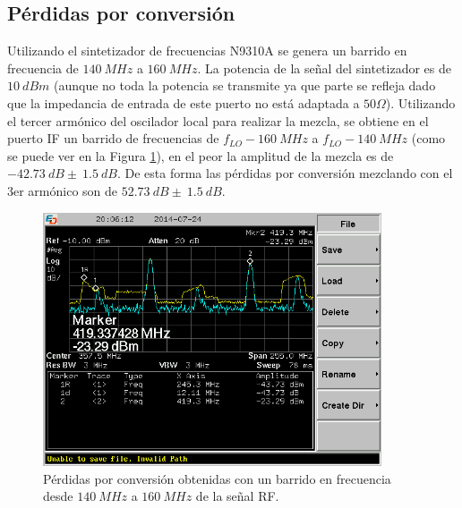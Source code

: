 \documentclass[a4paper,10pt]{article}
\begin{document}
	\subsection{P\'erdidas por conversi\'on}
	Utilizando el sintetizador de frecuencias N9310A se genera un barrido en frecuencia de $140~MHz$ a $160~MHz$. La potencia de la se\~nal del sintetizador es de $10~dBm$ (aunque no toda la potencia se transmite ya que parte se refleja dado que la impedancia de entrada de este puerto no est\'a adaptada a $50\Omega$). Utilizando el tercer arm\'onico del oscilador local para realizar la mezcla, se obtiene en el puerto IF un barrido de frecuencias de $f_{LO}-160~MHz$ a $f_{LO}-140~MHz$ (como se puede ver en la Figura \ref{perdidas}), en el peor  la amplitud de la mezcla es de $-42.73~dB\pm~1.5~dB$. De esta forma las p\'erdidas por conversi\'on mezclando con el 3er arm\'onico son de $52.73~dB\pm~1.5~dB$.
	
	
	\begin{figure}[!htb]
		\centering
		\includegraphics[width=10cm]{Images/SCREN538.png}
		\caption{P\'erdidas por conversi\'on obtenidas con un barrido en frecuencia desde $140~MHz$ a $160~MHz$ de la se\~nal RF.}
		\label{perdidas}
	\end{figure}	
	
\end{document}
